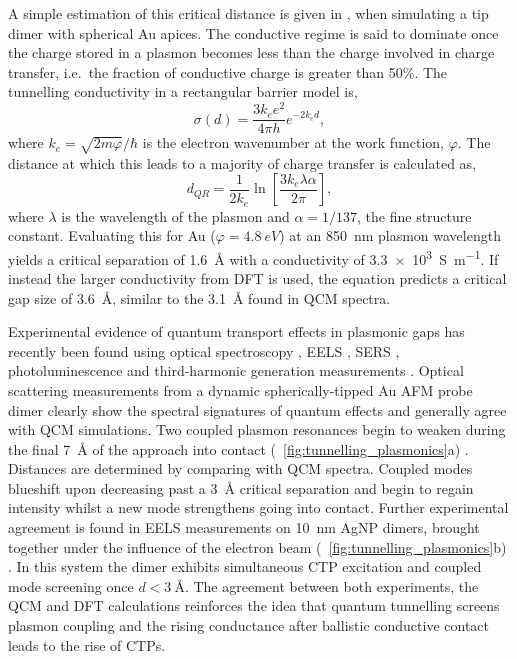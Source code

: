 \documentclass{article}
\begin{document}
A simple estimation of this critical distance is given in \cite{savage2012}, when simulating a tip dimer with spherical Au apices. The conductive regime is said to dominate once the charge stored in a plasmon becomes less than the charge involved in charge transfer, i.e.\ the fraction of conductive charge is greater than 50\%. The tunnelling conductivity in a rectangular barrier model is,
\begin{equation}
	\sigma(d) = \frac{3k_ee^2}{4\pi h} e^{-2k_e d},
\end{equation}
where $k_e=\sqrt{2m\varphi}/\hbar$ is the electron wavenumber at the work function, $\varphi$. The distance at which this leads to a majority of charge transfer is calculated as,
\begin{equation}
	d_{QR} = \frac{1}{2k_e}\ln\left[ \frac{3k_e\lambda\alpha}{2\pi} \right],
\end{equation}
where $\lambda$ is the wavelength of the plasmon and $\alpha=1/137$, the fine structure constant. Evaluating this for Au ($\varphi=\SI{4.8}{eV}$) at an \SI{850}{nm} plasmon wavelength yields a critical separation of \SI{1.6}{\angstrom} with a conductivity of \SI{3.3e3}{S.m^{-1}}. If instead the larger conductivity from DFT is used, the equation predicts a critical gap size of \SI{3.6}{\angstrom}, similar to the \SI{3.1}{\angstrom} found in QCM spectra.

Experimental evidence of quantum transport effects in plasmonic gaps has recently been found using optical spectroscopy \cite{savage2012, cha2014, zhu2014}, EELS \cite{scholl2013}, SERS \cite{zhu2014}, photoluminescence \cite{kravtsov2014} and third-harmonic generation measurements \cite{hajisalem2014}.
Optical scattering measurements from a dynamic spherically-tipped Au AFM probe dimer clearly show the spectral signatures of quantum effects and generally agree with QCM simulations. Two coupled plasmon resonances begin to weaken during the final \SI{7}{\angstrom} of the approach into contact (\figurename~\ref{fig:tunnelling_plasmonics}a) \cite{savage2012}. Distances are determined by comparing with QCM spectra. Coupled modes blueshift upon decreasing past a \SI{3}{\angstrom} critical separation and begin to regain intensity whilst a new mode strengthens going into contact. Further experimental agreement is found in EELS measurements on \SI{10}{nm} AgNP dimers, brought together under the influence of the electron beam (\figurename~\ref{fig:tunnelling_plasmonics}b) \cite{scholl2013}. In this system the dimer exhibits simultaneous CTP excitation and coupled mode screening once $d<\SI{3}{\angstrom}$. The agreement between both experiments, the QCM and DFT calculations reinforces the idea that quantum tunnelling screens plasmon coupling and the rising conductance after ballistic conductive contact leads to the rise of CTPs. %
\end{document}
